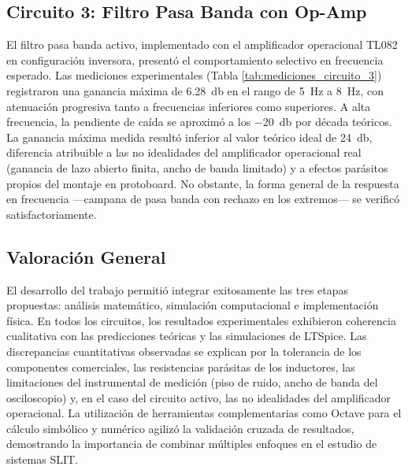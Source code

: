\subsection{Circuito 3: Filtro Pasa Banda con Op-Amp}
El filtro pasa banda activo, implementado con el amplificador operacional TL082 en configuración inversora, presentó el comportamiento selectivo en frecuencia esperado. Las mediciones experimentales (Tabla \ref{tab:mediciones_circuito_3}) registraron una ganancia máxima de \SI{6.28}{\decibel} en el rango de \SI{5}{\hertz} a \SI{8}{\hertz}, con atenuación progresiva tanto a frecuencias inferiores como superiores. A alta frecuencia, la pendiente de caída se aproximó a los \SI{-20}{\decibel} por década teóricos. La ganancia máxima medida resultó inferior al valor teórico ideal de \SI{24}{\decibel}, diferencia atribuible a las no idealidades del amplificador operacional real (ganancia de lazo abierto finita, ancho de banda limitado) y a efectos parásitos propios del montaje en protoboard. No obstante, la forma general de la respuesta en frecuencia ---campana de pasa banda con rechazo en los extremos--- se verificó satisfactoriamente.

\subsection{Valoración General}
El desarrollo del trabajo permitió integrar exitosamente las tres etapas propuestas: análisis matemático, simulación computacional e implementación física. En todos los circuitos, los resultados experimentales exhibieron coherencia cualitativa con las predicciones teóricas y las simulaciones de LTSpice. Las discrepancias cuantitativas observadas se explican por la tolerancia de los componentes comerciales, las resistencias parásitas de los inductores, las limitaciones del instrumental de medición (piso de ruido, ancho de banda del osciloscopio) y, en el caso del circuito activo, las no idealidades del amplificador operacional. La utilización de herramientas complementarias como Octave para el cálculo simbólico y numérico agilizó la validación cruzada de resultados, demostrando la importancia de combinar múltiples enfoques en el estudio de sistemas SLIT.
